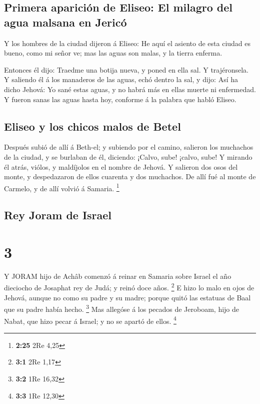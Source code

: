 \hypertarget{primera-apariciuxf3n-de-eliseo-el-milagro-del-agua-malsana-en-jericuxf3}{%
\subsection{Primera aparición de Eliseo: El milagro del agua malsana en
Jericó}\label{primera-apariciuxf3n-de-eliseo-el-milagro-del-agua-malsana-en-jericuxf3}}

 Y los hombres de la ciudad dijeron á Eliseo: He aquí el
asiento de esta ciudad es bueno, como mi señor ve; mas las aguas son
malas, y la tierra enferma.

 Entonces él dijo: Traedme una botija nueva, y poned en
ella sal. Y trajéronsela.  Y saliendo él á los manaderos de
las aguas, echó dentro la sal, y dijo: Así ha dicho Jehová: Yo sané
estas aguas, y no habrá más en ellas muerte ni enfermedad. 
Y fueron sanas las aguas hasta hoy, conforme á la palabra que habló
Eliseo.

\hypertarget{eliseo-y-los-chicos-malos-de-betel}{%
\subsection{Eliseo y los chicos malos de
Betel}\label{eliseo-y-los-chicos-malos-de-betel}}

 Después subió de allí á Beth-el; y subiendo por el camino,
salieron los muchachos de la ciudad, y se burlaban de él, diciendo:
¡Calvo, sube! ¡calvo, sube!  Y mirando él atrás, viólos, y
maldíjolos en el nombre de Jehová. Y salieron dos osos del monte, y
despedazaron de ellos cuarenta y dos muchachos.  De allí
fué al monte de Carmelo, y de allí volvió á Samaria. \footnote{\textbf{2:25}
  2Re 4,25}

\hypertarget{rey-joram-de-israel}{%
\subsection{Rey Joram de Israel}\label{rey-joram-de-israel}}

\hypertarget{section-2}{%
\section{3}\label{section-2}}

 Y JORAM hijo de Achâb comenzó á reinar en Samaria sobre
Israel el año dieciocho de Josaphat rey de Judá; y reinó doce años.
\footnote{\textbf{3:1} 2Re 1,17}  E hizo lo malo en ojos de
Jehová, aunque no como su padre y su madre; porque quitó las estatuas de
Baal que su padre había hecho. \footnote{\textbf{3:2} 1Re 16,32}
 Mas allegóse á los pecados de Jeroboam, hijo de Nabat, que
hizo pecar á Israel; y no se apartó de ellos. \footnote{\textbf{3:3} 1Re
  12,30}

